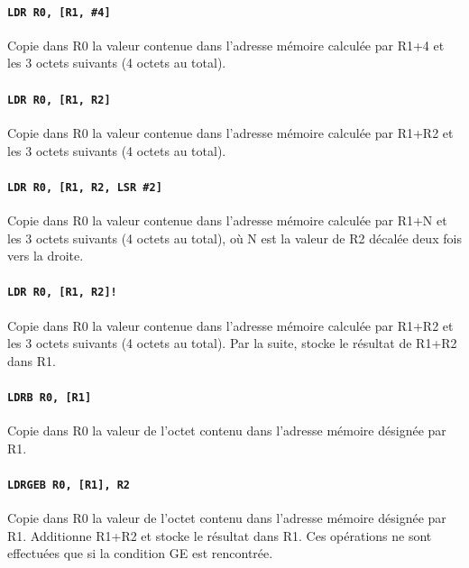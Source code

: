 \documentclass{tufte-handout}
\begin{document}
\paragraph{\texttt{LDR R0, [R1, \#4]}} Copie dans R0 la valeur contenue dans l'adresse mémoire calculée par R1+4 et les 3 octets suivants (4 octets au total).

\paragraph{\texttt{LDR R0, [R1, R2]}} Copie dans R0 la valeur contenue dans l'adresse mémoire calculée par R1+R2 et les 3 octets suivants (4 octets au total).


\paragraph{\texttt{LDR R0, [R1, R2, LSR \#2]}} Copie dans R0 la valeur contenue dans l'adresse mémoire calculée par R1+N et les 3 octets suivants (4 octets au total), où N est la valeur de R2 décalée deux fois vers la droite.

\paragraph{\texttt{LDR R0, [R1, R2]!}} Copie dans R0 la valeur contenue dans l'adresse mémoire calculée par R1+R2 et les 3 octets suivants (4 octets au total). Par la suite, stocke le résultat de R1+R2 dans R1.

\paragraph{\texttt{LDRB R0, [R1]}} Copie dans R0 la valeur de l'octet contenu dans l'adresse mémoire désignée par R1.

\paragraph{\texttt{LDRGEB R0, [R1], R2}} Copie dans R0 la valeur de l'octet contenu dans l'adresse mémoire désignée par R1. Additionne R1+R2 et stocke le résultat dans R1. Ces opérations ne sont effectuées que si la condition GE est rencontrée.
\end{document}
